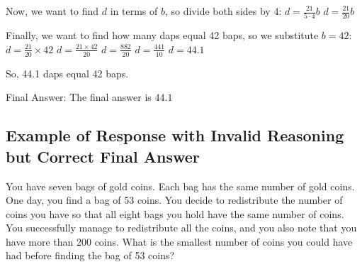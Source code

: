 \begin{paracol}{2}
\begin{tcolorbox}[breakable, colframe=red!70, colback=red!10, title=Incorrect Response]
Now, we want to find $d$ in terms of $b$, so divide both sides by 4:
$d = \frac{21}{5 \cdot 4}b$
$d = \frac{21}{20}b$

Finally, we want to find how many daps equal 42 baps, so we substitute $b=42$:
$d = \frac{21}{20} \times 42$
$d = \frac{21 \times 42}{20}$
$d = \frac{882}{20}$
$d = \frac{441}{10}$
$d = 44.1$

So, 44.1 daps equal 42 baps.

Final Answer: The final answer is $\boxed{44.1}$

\end{tcolorbox}

\end{paracol}

\subsection{Example of Response with Invalid Reasoning but Correct Final Answer}

\vspace{0.4cm}
\begin{tcolorbox}[title=Question, breakable]
You have seven bags of gold coins. Each bag has the same number of gold coins. One day, you find a bag of 53 coins. You decide to redistribute the number of coins you have so that all eight bags you hold have the same number of coins. You successfully manage to redistribute all the coins, and you also note that you have more than 200 coins. What is the smallest number of coins you could have had before finding the bag of 53 coins?
\end{tcolorbox}


